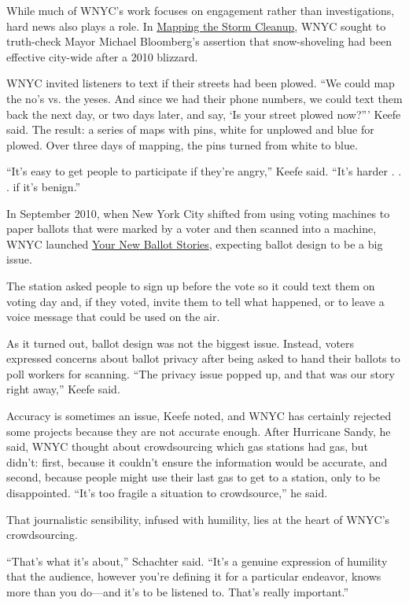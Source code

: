 \documentclass[notoc, symmetric, nobib, nols]{towcenter-guideto-book}
\begin{document}
While much of WNYC's work focuses on engagement rather than investigations, hard news also plays a role. In \href{http://www.wnyc.org/story/105548-2-mapping-storm-clean-/}{Mapping the Storm Cleanup}, WNYC sought to truth-check Mayor Michael Bloomberg's assertion that snow-shoveling had been effective city-wide after a 2010 blizzard.\autocite{Storm} 

WNYC invited listeners to text if their streets had been plowed. ``We could map the no's vs. the yeses. And since we had their phone numbers, we could text them back the next day, or two days later, and say, ‘Is your street plowed now?''' Keefe said. The result: a series of maps with pins, white for unplowed and blue for plowed. Over three days of mapping, the pins turned from white to blue. 

``It's easy to get people to participate if they're angry,'' Keefe said. ``It's harder . . . if it's benign.''

In September 2010, when New York City shifted from using voting machines to paper ballots that were marked by a voter and then scanned into a machine, WNYC launched \href{http://www.wnyc.org/story/94305-text-ballot-your-primary-day-reports/}{Your New Ballot Stories}, expecting ballot 
design to be a big issue.\autocite{Ballot} 

The station asked people to sign up before the vote so it could text them on voting day and, if they voted, invite them to tell what happened, or to leave a voice message that could be used on the air. 

As it turned out, ballot design was not the biggest issue. Instead, voters expressed concerns about ballot privacy after being asked to hand their ballots to poll workers for scanning. ``The privacy issue popped up, and that was our story right away,'' Keefe said.

Accuracy is sometimes an issue, Keefe noted, and WNYC has certainly rejected some projects because they are not accurate enough. After Hurricane Sandy, he said, WNYC thought about crowdsourcing which gas stations had gas, but didn't: first, because it couldn't ensure the information would be accurate, and second, because people might use their last gas to get to a station, only to be disappointed. ``It's too fragile a situation to crowdsource,'' he said. 

That journalistic sensibility, infused with humility, lies at the heart of WNYC's crowdsourcing.

``That's what it's about,'' Schachter said. ``It's a genuine expression of humility that the audience, however you're defining it for a particular endeavor, knows more than you do---and it's to be listened to. That's really important.''
\end{document}

